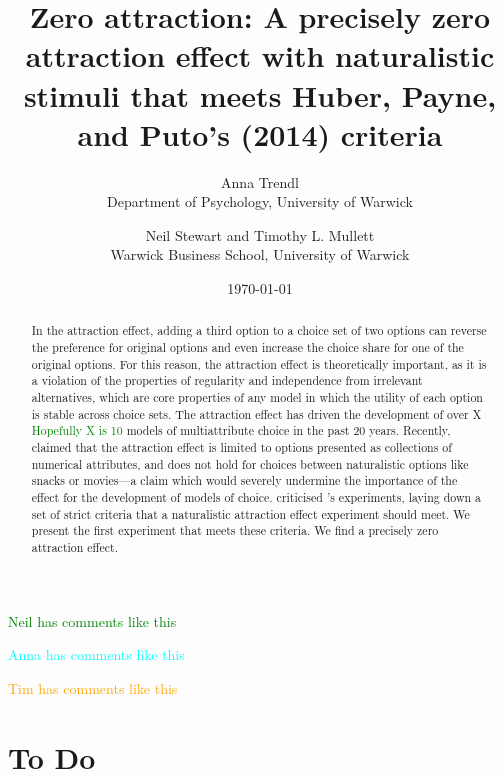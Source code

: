 \documentclass[12pt, a4paper]{article}
\title{}
\author{}
\date{}
\title{Zero attraction: A precisely zero attraction effect with naturalistic stimuli that meets Huber, Payne, and Puto's (2014) criteria}
\author{Anna Trendl\\Department of Psychology, University of Warwick \and Neil Stewart and Timothy L. Mullett\\Warwick Business School, University of Warwick}
\date{\today}
\newcommand{\NS}[1] {{\textcolor{green}{#1}}}
\newcommand{\AT}[1] {{\textcolor{cyan}{#1}}}
\newcommand{\TM}[1] {{\textcolor{orange}{#1}}}
\begin{document}
\begin{titlepage}
\maketitle

\newpage

\begin{abstract}
In the attraction effect, adding a third option to a choice set of two options can reverse the preference for original options and even increase the choice share for one of the original options. For this reason, the attraction effect is theoretically important, as it is a violation of the properties of regularity and independence from irrelevant alternatives, which are core properties of any model in which the utility of each option is stable across choice sets. The attraction effect has driven the development of over X \NS{Hopefully X is 10} models of multiattribute choice in the past 20 years. Recently,  claimed that the attraction effect is limited to options presented as collections of numerical attributes, and does not hold for choices between naturalistic options like snacks or movies---a claim which would severely undermine the importance of the effect for the development of models of choice.  criticised \citeauthor{Frederick2014}'s experiments, laying down a set of strict criteria that a naturalistic attraction effect experiment should meet. We present the first experiment that meets these criteria. We find a precisely zero attraction effect. 
\end{abstract}
\end{titlepage}



\NS{Neil has comments like this}

\AT{Anna has comments like this}

\TM{Tim has comments like this}


\section{To Do}
\end{document}

